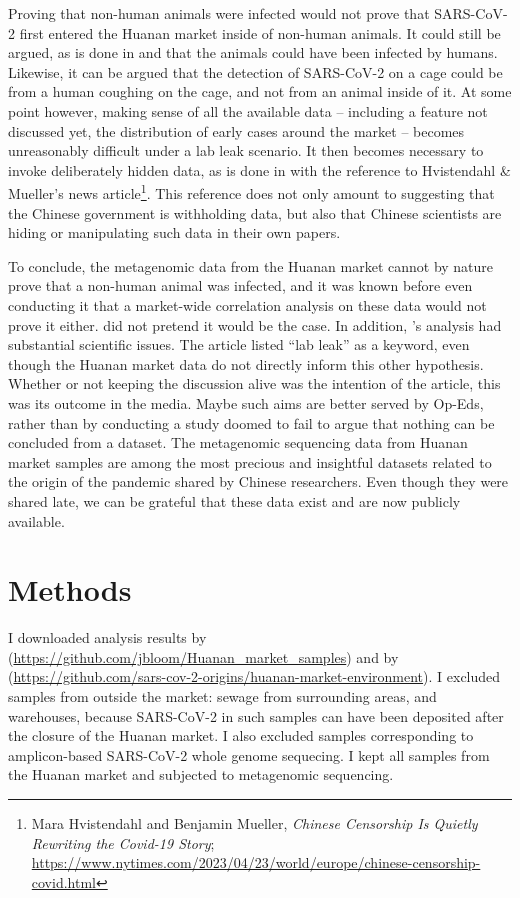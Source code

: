 \documentclass[11pt]{article}
\def \sct {\mbox{SARS-CoV-2}}
\begin{document}
Proving that non-human animals were infected would not prove that \sct{} first entered the Huanan market inside of non-human animals. It could still be argued, as is done in \citet{Liu2023Nature} and \citet{Bloom2023VE} that the animals could have been infected by humans. Likewise, it can be argued that the detection of \sct{} on a cage could be from a human coughing on the cage, and not from an animal inside of it. At some point however, making sense of all the available data -- including a feature not discussed yet, the distribution of early cases around the market \citep{Worobey2022Science} -- becomes unreasonably difficult under a lab leak scenario. It then becomes necessary to invoke deliberately hidden data, as is done in \citet{Bloom2023VE} with the reference to Hvistendahl \& Mueller's news article\footnote{Mara Hvistendahl and Benjamin Mueller, \textit{Chinese Censorship Is Quietly Rewriting the Covid-19 Story}; \url{https://www.nytimes.com/2023/04/23/world/europe/chinese-censorship-covid.html}}. This reference does not only amount to suggesting that the Chinese government is withholding data, but also that Chinese scientists are hiding or manipulating such data in their own papers. 

To conclude, the metagenomic data from the Huanan market cannot by nature prove that a non-human animal was infected, and it was known before even conducting it that a market-wide correlation analysis on these data would not prove it either. \citet{ACC2023Zenodo} did not pretend it would be the case. In addition, \citet{Bloom2023VE}'s analysis had substantial scientific issues. The article listed ``lab leak'' as a keyword, even though the Huanan market data do not directly inform this other hypothesis. Whether or not keeping the discussion alive was the intention of the article, this was its outcome in the media. Maybe such aims are better served by Op-Eds, rather than by conducting a study doomed to fail to argue that nothing can be concluded from a dataset. The metagenomic sequencing data from Huanan market samples are among the most precious and insightful datasets related to the origin of the pandemic shared by Chinese researchers. Even though they were shared late, we can be grateful that these data exist and are now publicly available.        

\section{Methods}
I downloaded analysis results by \citet{Bloom2023VE} (\url{https://github.com/jbloom/Huanan_market_samples}) and by \citet{ACC2023bioRxiv} (\url{https://github.com/sars-cov-2-origins/huanan-market-environment}). I excluded samples from outside the market: sewage from surrounding areas, and warehouses, because \sct{} in such samples can have been deposited after the closure of the Huanan market. I also excluded samples corresponding to amplicon-based \sct{} whole genome sequecing. I kept all samples from the Huanan market and subjected to metagenomic sequencing.  
\end{document}
